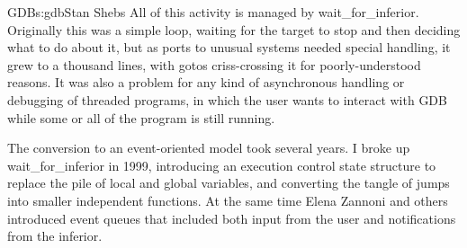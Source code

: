 \begin{aosachapter}{GDB}{s:gdb}{Stan Shebs}
All of this activity is managed by wait\_for\_inferior.  Originally this
was a simple loop, waiting for the target to stop and then deciding
what to do about it, but as ports to unusual systems needed special
handling, it grew to a thousand lines, with gotos criss-crossing it
for poorly-understood reasons.  It was also a problem for any kind of
asynchronous handling or debugging of threaded programs, in which the
user wants to interact with GDB while some or all of the program is
still running.

The conversion to an event-oriented model took several years.  I broke
up wait\_for\_inferior in 1999, introducing an execution control state
structure to replace the pile of local and global variables, and
converting the tangle of jumps into smaller independent functions.  At
the same time Elena Zannoni and others introduced event queues that
included both input from the user and notifications from the inferior.

\end{aosachapter}
